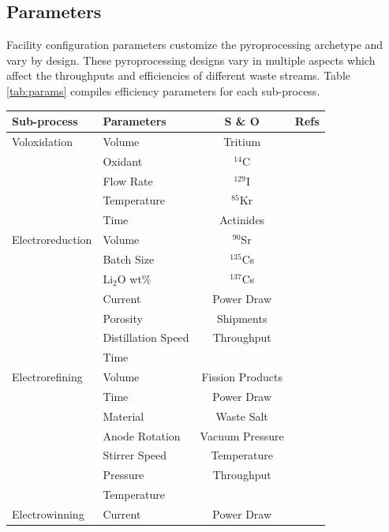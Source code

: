 \documentclass{anstrans}
\begin{document}
\subsection{Parameters}
Facility configuration parameters customize the pyroprocessing archetype and vary by design. 
These pyroprocessing designs vary in multiple aspects which affect the throughputs and efficiencies of different waste streams. 
Table \ref{tab:params} compiles efficiency parameters for each sub-process.

\begin{table}[h]
	\centering
	\begin{tabularx}{0.5\textwidth}{llcr}
		\hline
		\textbf{Sub-process} & \textbf{Parameters} & \textbf{S \& O} & \textbf{Refs} \\
		\hline
		Voloxidation & Volume & Tritium & \cite{jubin_spent_2009} \\
		& Oxidant & $^{14}$C & \cite{flowsheet_1998} \\
		& Flow Rate &  $^{129}$I &  \\
		& Temperature & $^{85}$Kr &  \\
		& Time & Actinides & \\ \hline
		Electroreduction & Volume & $^{90}$Sr & \cite{Borrelli_2017} \\
		& Batch Size & $^{135}$Cs & \cite{flowsheet_1998} \\
		& Li$_2$O wt\% & $^{137}$Cs & \cite{choi_electrochemical_2015} \\
		& Current & Power Draw & \cite{lee_korean_2011} \\
		& Porosity & Shipments & \cite{lee_modeling_2016} \\
		& Distillation Speed & Throughput & \\ 
		& Time & & \\ \hline
		Electrorefining & Volume & Fission Products & \cite{lee_advanced_2008} \\
		& Time & Power Draw & \cite{lee_korean_2011} \\
		& Material & Waste Salt & \cite{flowsheet_1998} \\
		& Anode Rotation & Vacuum Pressure & \cite{koyama_development_2012} \\
		& Stirrer Speed & Temperature & \cite{kim_development_2013} \\
		& Pressure & Throughput & \\
		& Temperature & & \\ \hline
		Electrowinning & Current & Power Draw & \cite{flowsheet_1998} \\

\end{tabularx}
\end{table}
\end{document}
